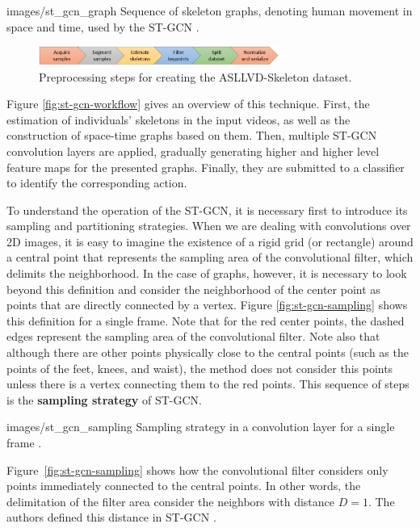     {images/st_gcn_graph}
    {Sequence of skeleton graphs, denoting human movement in space and time, used by the ST-GCN \cite[p. 1]{st-gcn-2018}.}

\begin{figure}[ht!]
    \centering
    \includegraphics[width=0.7\textwidth]{en/images/dataset_preprocessing}
    \caption{Preprocessing steps for creating the ASLLVD-Skeleton dataset.}
    \label{fig:preprocessamento}
\end{figure}

Figure \ref{fig:st-gcn-workflow} gives an overview of this technique. First, the estimation of individuals' skeletons in the input videos, as well as the construction of space-time graphs based on them. Then, multiple ST-GCN convolution layers are applied, gradually generating higher and higher level feature maps for the presented graphs. Finally, they are submitted to a classifier to identify the corresponding action.

To understand the operation of the ST-GCN, it is necessary first to introduce its sampling and partitioning strategies. When we are dealing with convolutions over 2D images, it is easy to imagine the existence of a rigid grid (or rectangle) around a central point that represents the sampling area of the convolutional filter, which delimits the neighborhood. In the case of graphs, however, it is necessary to look beyond this definition and consider the neighborhood of the center point as points that are directly connected by a vertex. Figure \ref{fig:st-gcn-sampling} shows this definition for a single frame. Note that for the red center points, the dashed edges represent the sampling area of the convolutional filter. Note also that although there are other points physically close to the central points (such as the points of the feet, knees, and waist), the method does not consider this points unless there is a vertex connecting them to the red points. This sequence of steps is the \textbf{sampling strategy} of ST-GCN.

    {images/st_gcn_sampling}
    {Sampling strategy in a convolution layer for a single frame \cite[p. 5]{st-gcn-2018}.}

Figure~\ref{fig:st-gcn-sampling} shows how the convolutional filter considers only points immediately connected to the central points. In other words, the delimitation of the filter area consider the neighbors with distance $D = 1$. The authors defined this distance in ST-GCN \cite{st-gcn-2018}.

